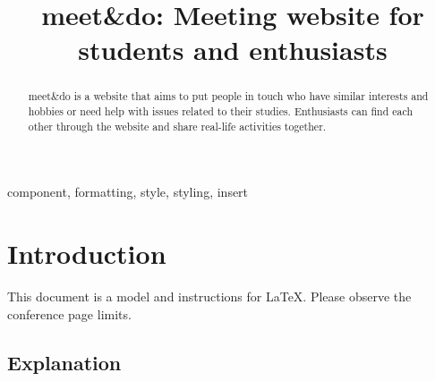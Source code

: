 \documentclass[conference]{IEEEtran}
\begin{document}
\title{meet\&do: Meeting website for students and enthusiasts\\}

\author{
\and
{}
\and
{}
\and
{}
}

\maketitle

\begin{abstract}
meet\&do is a website that aims to put people in touch who have similar interests and hobbies or need help with issues related to their studies. Enthusiasts can find each other through the website and share real-life activities together.
\end{abstract}

\begin{IEEEkeywords}
component, formatting, style, styling, insert
\end{IEEEkeywords}

\section{Introduction}
This document is a model and instructions for \LaTeX.
Please observe the conference page limits.

\subsection{Explanation}
\end{document}
